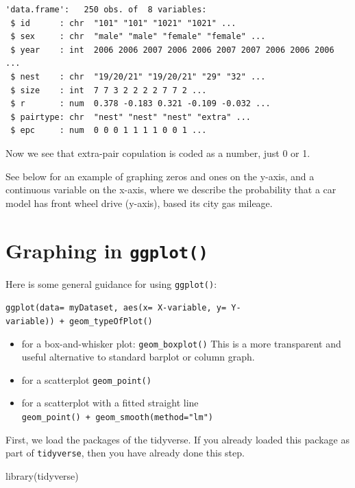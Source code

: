 \documentclass[
  letterpaper,
  DIV=11,
  numbers=noendperiod]{scrreprt}
\newenvironment{Shaded}{\begin{snugshade}}{\end{snugshade}}
\newcommand{\FunctionTok}[1]{\textcolor[rgb]{0.28,0.35,0.67}{#1}}
\newcommand{\NormalTok}[1]{\textcolor[rgb]{0.00,0.23,0.31}{#1}}
\providecommand{\tightlist}{%
  \setlength{\itemsep}{0pt}\setlength{\parskip}{0pt}}
\begin{document}
\begin{verbatim}
'data.frame':   250 obs. of  8 variables:
 $ id      : chr  "101" "101" "1021" "1021" ...
 $ sex     : chr  "male" "male" "female" "female" ...
 $ year    : int  2006 2006 2007 2006 2006 2007 2007 2006 2006 2006 ...
 $ nest    : chr  "19/20/21" "19/20/21" "29" "32" ...
 $ size    : int  7 7 3 2 2 2 2 7 7 2 ...
 $ r       : num  0.378 -0.183 0.321 -0.109 -0.032 ...
 $ pairtype: chr  "nest" "nest" "nest" "extra" ...
 $ epc     : num  0 0 0 1 1 1 1 0 0 1 ...
\end{verbatim}

Now we see that extra-pair copulation is coded as a number, just 0 or 1.

See below for an example of graphing zeros and ones on the y-axis, and a
continuous variable on the x-axis, where we describe the probability
that a car model has front wheel drive (y-axis), based its city gas
mileage.

\section{\texorpdfstring{Graphing in
\texttt{ggplot()}}{Graphing in ggplot()}}\label{graphing-in-ggplot}

Here is some general guidance for using \texttt{ggplot()}:

\texttt{ggplot(data=\ myDataset,\ aes(x=\ X-variable,\ y=\ Y-variable))\ +\ geom\_typeOfPlot()}

\begin{itemize}
\tightlist
\item
  for a box-and-whisker plot: \texttt{geom\_boxplot()} This is a more
  transparent and useful alternative to standard barplot or column
  graph.
\item
  for a scatterplot \texttt{geom\_point()}
\item
  for a scatterplot with a fitted straight line
  \texttt{geom\_point()\ +\ geom\_smooth(method="lm")}
\end{itemize}

First, we load the packages of the tidyverse. If you already loaded this
package as part of \texttt{tidyverse}, then you have already done this
step.

\begin{Shaded}
\begin{Highlighting}[]
\FunctionTok{library}\NormalTok{(tidyverse)}
\end{Highlighting}
\end{Shaded}
\end{document}
